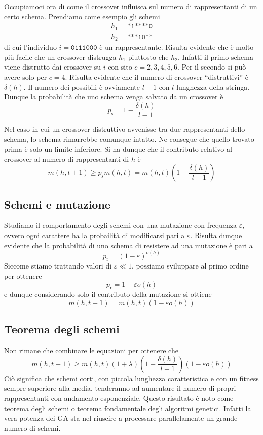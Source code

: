 \documentclass[a4paper, 11pt]{article}
\newcommand{\code}{\texttt}
\begin{document}
Occupiamoci ora di come il crossover influisca sul numero di rappresentanti di
un certo schema. Prendiamo come esempio gli schemi
\begin{align*}
h_1=\code{*1****0}\\
h_2=\code{***10**}
\end{align*}
di cui l'individuo $i=\code{0111000}$ \`e un rappresentante. Risulta evidente
che \`e molto pi\`u facile che un crossover distrugga $h_1$ piuttosto che
$h_2$. Infatti il primo schema viene distrutto dai crossover su $i$ con sito
$c=2,3,4,5,6$. Per il secondo si pu\`o avere solo per $c=4$. Risulta evidente
che il numero di crossover ``distruttivi'' \`e $\delta (h)$. Il numero dei
possibili \`e ovviamente $l-1$ con $l$ lunghezza della stringa. Dunque la
probabilit\`a che uno schema venga salvato da un crossover \`e
$$p_\text{s}=1-\frac{\delta (h)}{l-1}$$

Nel caso in cui un crossover distruttivo avvenisse tra due rappresentanti dello
schema, lo schema rimarrebbe comunque intatto. Ne consegue che quello trovato
prima \`e solo un limite inferiore. Si ha dunque che il contributo relativo al
crossover al numero di rappresentanti di $h$ \`e
$$m(h, t+1)\geq p_\text{s}m(h,t)=m(h,t)\left(1- \frac{\delta (h)}{l-1} \right)$$


\subsection{Schemi e mutazione}

Studiamo il comportamento degli schemi con una mutazione con frequenza
$\varepsilon$, ovvero ogni carattere ha la probailit\`a di modificarsi pari a
$\varepsilon$. Risulta dunque evidente che la probabilit\`a di uno schema di
resistere ad una mutazione \`e pari a 
$$p_\text{r}=\left(1-\varepsilon\right)^{o(h)}$$
Siccome stiamo trattando valori di $\varepsilon \ll 1$, possiamo sviluppare al
primo ordine per ottenere
$$p_\text{r}=1-\varepsilon o(h)$$
e dunque considerando solo il contributo della mutazione si ottiene
$$m(h,t+1)=m(h,t)\left(1-\varepsilon o(h)\right)$$


\subsection{Teorema degli schemi}

Non rimane che combinare le equazioni per ottenere che
$$m(h, t+1) \geq m(h,t) \left(1+\lambda \right) \left(1-\frac{\delta
(h)}{l-1}\right) \left(1- \varepsilon o(h) \right)$$
Ci\`o significa che schemi corti, con piccola lunghezza caratteristica e con un
fitness sempre superiore alla media, tenderanno ad aumentare il numero di propri
rappresentanti con andamento esponenziale. Questo risultato \`e noto come
teorema degli schemi o teorema fondamentale degli algoritmi genetici. Infatti la
vera potenza dei GA sta nel riuscire a processare parallelamente un grande numero
di schemi.
\end{document}
